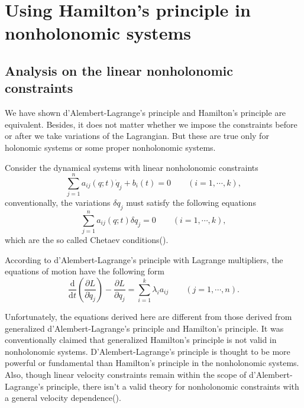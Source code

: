 \documentclass[preprint,11pt]{elsarticle}
\newcommand{\mathd}{\mathrm{d}}
\begin{document}
\section{Using Hamilton's principle in nonholonomic systems}\label{s3}


\subsection{Analysis on the linear nonholonomic constraints}
We have shown d'Alembert-Lagrange's principle and Hamilton's principle are equivalent.
Besides, it does not matter whether we impose the constraints before or after we take variations of the Lagrangian.
But these are true only for holonomic systems or some proper nonholonomic systems.

Consider the dynamical systems with linear nonholonomic constraints
\begin{equation}
  \sum_{j = 1}^n a_{i j} ( q ; t) \dot{q}_j + b_i ( t) = 0 \hspace{2em} ( i =
  1, \cdots, k), \label{nonholonomicconstraints}
\end{equation}
conventionally, the variations $\delta q_j$ must satisfy the following equations
\begin{equation}\label{chetaev}
  \sum_{j = 1}^n a_{i j} ( q ; t) \delta q_j = 0 \hspace{2em} ( i = 1,
   \cdots, k),
\end{equation}
which are the so called Chetaev conditions(\cite{goldenstein}).

According to d'Alembert-Lagrange's principle with Lagrange multipliers, the
equations of motion have the following form
\begin{equation}\label{linearnheom}
  \frac{\mathd}{\mathd t} \left( \frac{\partial L}{\partial \dot{q}_j}
   \right) - \frac{\partial L}{\partial q_j} = \sum_{i = 1}^k \lambda_i a_{i
   j} \hspace{2em} ( j = 1, \cdots, n) .
\end{equation}

Unfortunately, the equations derived here are different from those derived from generalized d'Alembert-Lagrange's principle and Hamilton's principle.
It was conventionally claimed that generalized Hamilton's principle is not valid in nonholonomic systems.
D'Alembert-Lagrange's principle is thought to be more powerful or fundamental than Hamilton's principle in the nonholonomic systems.
Also, though linear velocity constraints remain within the scope of d'Alembert-Lagrange's principle, there isn't a valid theory for nonholonomic constraints with a general velocity dependence(\cite{flannery2005}).
\end{document}
